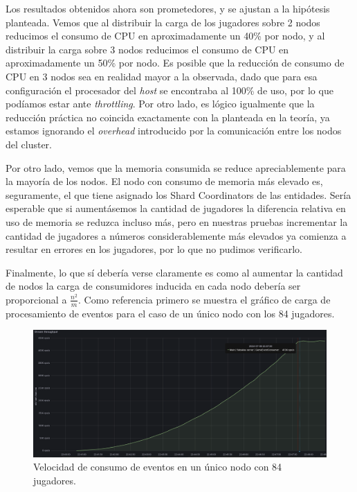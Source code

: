 \noindent Los resultados obtenidos ahora son prometedores, y se ajustan a la hipótesis planteada. Vemos que al distribuir la carga de los jugadores
sobre 2 nodos reducimos el consumo de CPU en aproximadamente un 40\% por nodo, y al distribuir la carga sobre 3 nodos reducimos el consumo de CPU en aproximadamente un 50\% por nodo.
Es posible que la reducción de consumo de CPU en 3 nodos sea en realidad mayor a la observada, dado que para esa configuración el procesador del \textit{host} se encontraba al 100\% de uso,
por lo que podíamos estar ante \textit{throttling}. Por otro lado, es lógico igualmente que la reducción práctica no coincida exactamente con la planteada en la teoría, ya estamos ignorando el \textit{overhead} introducido por la comunicación entre los nodos del cluster.

Por otro lado, vemos que la memoria consumida se reduce apreciablemente para la mayoría de los nodos. El nodo con consumo de memoria más elevado es, seguramente, el que tiene
asignado los Shard Coordinators de las entidades. Sería esperable que si aumentásemos la cantidad de jugadores la diferencia relativa en uso de memoria se reduzca incluso más, pero en nuestras pruebas
incrementar la cantidad de jugadores a números considerablemente más elevados ya comienza a resultar en errores en los jugadores, por lo que no pudimos verificarlo.

Finalmente, lo que sí debería verse claramente es como al aumentar la cantidad de nodos la carga de consumidores inducida en cada nodo debería ser proporcional a $\frac{n^2}{m}$.
Como referencia primero se muestra el gráfico de carga de procesamiento de eventos para el caso de un único nodo con los 84 jugadores.

\begin{figure}[htbp]
    \centering
    \includegraphics[width=1\textwidth]{../assets/fiubakka-consumer-single-node-metrics.png}
    \caption{Velocidad de consumo de eventos en un único nodo con 84 jugadores.}
\end{figure}

